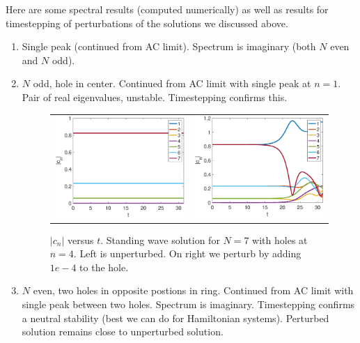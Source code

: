 \documentclass[12pt]{article}
\begin{document}
Here are some spectral results (computed numerically) as well as results for timestepping of perturbations of the solutions we discussed above.
\begin{enumerate}
\item Single peak (continued from AC limit). Spectrum is imaginary (both $N$ even and $N$ odd).

\item $N$ odd, hole in center. Continued from AC limit with single peak at $n = 1$. Pair of real eigenvalues, unstable. Timestepping confirms this.

\begin{figure}[H]
\begin{center}
\begin{tabular}{cc}
\includegraphics[width=7cm]{images/oddhole7.eps} &
\includegraphics[width=7cm]{images/oddhole7perturbed.eps} 
\end{tabular}
\end{center}
\caption{$|c_n|$ versus $t$. Standing wave solution for $N = 7$ with holes at $n = 4$. Left is unperturbed. On right we perturb by adding $1e-4$ to the hole.}
\label{fig:oddhole7}
\end{figure}

\item $N$ even, two holes in opposite postions in ring. Continued from AC limit with single peak between two holes. Spectrum is imaginary. Timestepping confirms a neutral stability (best we can do for Hamiltonian systems). Perturbed solution remains close to unperturbed solution.


\end{enumerate}
\end{document}
